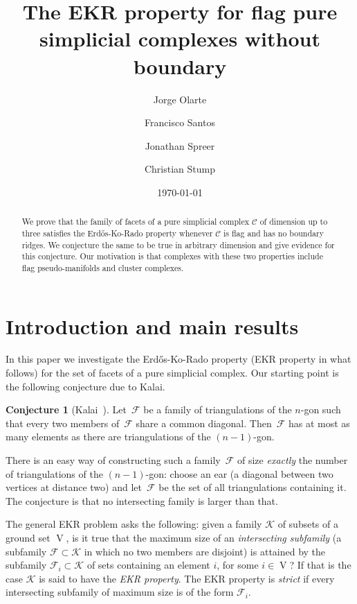 \documentclass[a4paper,12pt]{amsart}
\title[EKR for flag pure complexes without boundary]
{The EKR property for flag pure \\ simplicial complexes without boundary}
\date{\today}
\author[J.~Olarte]{Jorge Olarte}
\author[F.~Santos]{Francisco Santos}
\author[J.~Spreer]{Jonathan Spreer}
\author[C.~Stump]{Christian Stump}
\theoremstyle{plain}
\theoremstyle{definition}
\newtheorem{conjecture}[theorem]{Conjecture}
\newcommand{\darkred}{\color{darkred}} %
\newcommand{\C}{\mathcal C}
\newcommand{\K}{\mathcal K}
\newcommand{\family}{\mathcal F}
\DeclareMathOperator{\vertices}{V}
\newcommand{\defn}[1]{\emph{\darkred #1}} %
\begin{document}
\begin{abstract}
  We prove that the family of facets of a pure simplicial complex $\C$ of dimension up to three satisfies the Erd\H{o}s-Ko-Rado property whenever $\C$ is  flag and has no boundary ridges. We conjecture the same to be true in arbitrary dimension and give evidence for this conjecture.
  Our motivation is that complexes with these two properties include flag pseudo-manifolds and cluster complexes.
\end{abstract}

\maketitle



\section{Introduction and main results}

In this paper we investigate the Erd\H{o}s-Ko-Rado property (EKR property in what follows) for the set of facets of a pure simplicial complex. Our starting point  is the following conjecture due to Kalai.

\begin{conjecture}[{Kalai~\cite{Kalai15MathOverflow}}]
\label{conj:triangulations}
Let~$\family$ be a family of triangulations of the $n$-gon such that every two members of~$\family$ share a common diagonal. Then~$\family$ has at most as many elements as there are triangulations of the $(n-1)$-gon.
\end{conjecture}

There is an easy way of constructing such a family~$\family$ of size \emph{exactly} the number of triangulations of the $(n-1)$-gon: choose an ear (a diagonal between two vertices at distance two) and let~$\family$ be the set of all triangulations containing it. The conjecture is that no intersecting family is larger than that.

The general EKR problem asks the following: given a family $\K$ of subsets of a ground set $\vertices$, is it true that the maximum size of an \defn{intersecting subfamily} (a subfamily $\family\subset \K$ in which no two members are disjoint) is attained by the subfamily $\family_i\subset \K$ of sets containing an element $i$, for some $i \in \vertices$? If that is the case $\K$ is said to have the \defn{EKR property}. The EKR property is \defn{strict} if every  intersecting subfamily of maximum size is of the form $\family_i$.
\end{document}
